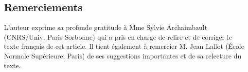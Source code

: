 \documentclass[french,output=paper,colorlinks,citecolor=brown]{../langscibook}
\begin{document}
\begin{otherlanguage}{french}
\section*{Remerciements}
L'auteur exprime sa profonde gratitude à Mme Sylvie Archaimbault (CNRS/Univ. Paris-Sorbonne) qui a pris en charge de relire et de corriger le texte français de cet article. Il tient également à remercier M. Jean Lallot (École Normale Supérieure, Paris) de ses suggestions importantes et de sa relecture du texte.

%


{\sloppy\printbibliography[heading=subbibliography,notkeyword=this]}
\end{otherlanguage}
\end{document}
